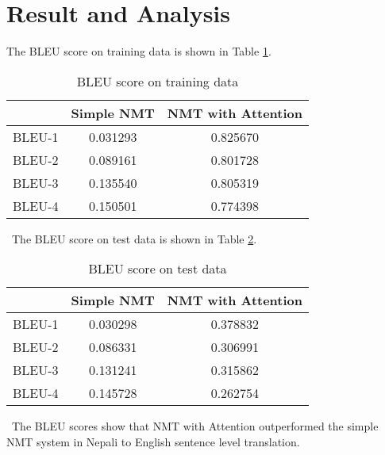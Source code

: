 \section{Result and Analysis}
The BLEU score on training data is shown in Table \ref{table:5.1}.
\begin{table}[H]
\centering
\def\arraystretch{1.25}
\caption{BLEU score on training data}
\label{table:5.1}
\vspace{5pt}
\begin{tabular}{|c|c|c|} \hline
& \textbf{Simple NMT} & \textbf{NMT with Attention} \\ \hline
BLEU-1 & 0.031293 & 0.825670 \\ \hline
BLEU-2 & 0.089161 & 0.801728 \\ \hline
BLEU-3 & 0.135540 & 0.805319 \\ \hline
BLEU-4 & 0.150501 & 0.774398 \\ \hline
\end{tabular}
\end{table}
\
The BLEU score on test data is shown in Table \ref{table:5.2}.
\begin{table}[H]
\centering
\def\arraystretch{1.25}
\caption{BLEU score on test data}
\label{table:5.2}
\vspace{5pt}
\begin{tabular}{|c|c|c|} \hline
& \textbf{Simple NMT} & \textbf{NMT with Attention} \\ \hline
BLEU-1 & 0.030298 & 0.378832 \\ \hline
BLEU-2 & 0.086331 & 0.306991 \\ \hline
BLEU-3 & 0.131241 & 0.315862 \\ \hline
BLEU-4 & 0.145728 & 0.262754 \\ \hline
\end{tabular}
\end{table}
\
The BLEU scores show that NMT with Attention outperformed the simple NMT system in Nepali to English sentence level translation.